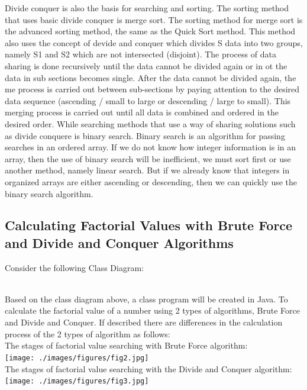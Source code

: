 \documentclass[12pt,titlepage]{article}
\begin{document}
Divide conquer is also the basis for searching and sorting. The sorting method that uses basic divide conquer is merge sort. The sorting method for merge sort is the advanced sorting method, the same as the Quick Sort method. This method also uses the concept of devide and conquer which divides S data into two groups, namely S1 and S2 which are not intersected (disjoint). The process of data sharing is done recursively until the data cannot be divided again or in ot the data in sub sections becomes single. After the data cannot be divided again, the me process is carried out between sub-sections by paying attention to the desired data sequence (ascending / small to large or descending / large to small). This merging process is carried out until all data is combined and ordered in the desired order. While searching methods that use a way of sharing solutions such as divide conquere is binary search. Binary search is an algorithm for passing searches in an ordered array. If we do not know how integer information is in an array, then the use of binary search will be inefficient, we must sort first or use another method, namely linear search. But if we already know that integers in organized arrays are either ascending or descending, then we can quickly use the binary search algorithm.

\subsection{Calculating Factorial Values with Brute Force and Divide and Conquer Algorithms}
Consider the following Class Diagram:
\mbox{}\\
\mbox{}\\
Based on the class diagram above, a class program will be created in Java. To calculate the factorial value of a number using 2 types of algorithms, Brute Force and Divide and Conquer. If described there are differences in the calculation process of the 2 types of algorithm as follows:
\mbox{}\\
The stages of factorial value searching with Brute Force algorithm:
\mbox{}\\
\texttt{[image: ./images/figures/fig2.jpg]}
\mbox{}\\
The stages of factorial value searching with the Divide and Conquer algorithm:
\mbox{}\\
\texttt{[image: ./images/figures/fig3.jpg]}
\end{document}
